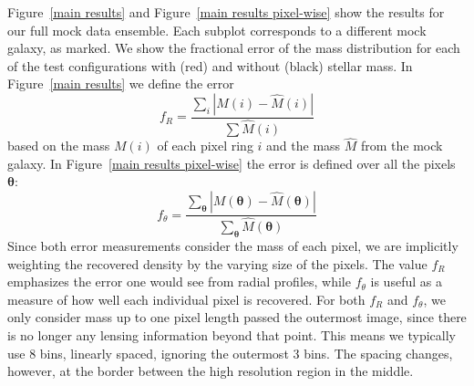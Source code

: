\documentclass[galley,usenatbib]{mn2e}
\renewcommand{\vec}[1]{\ensuremath{\boldsymbol{#1}}}
\newcommand{\figref}[1] {Figure~\ref{#1}}
\begin{document}
\figref{main results} and \figref{main results pixel-wise} show the results for
our full mock data ensemble. Each subplot corresponds to a different mock
galaxy, as marked. We show the fractional error of the mass distribution for
each of the test configurations with (red) and without (black) stellar mass. In
\figref{main results} we define the error
%
\begin{equation} \label{ferror R}
  f_R = \frac {\sum_i \left|M(i) - \widehat M(i)\right| } {\sum \widehat M(i)}
\end{equation}
%
based on the mass $M(i)$ of each pixel ring $i$ and the mass $\widehat M$ from the mock galaxy. 
In \figref{main results pixel-wise} the error is defined over all the pixels $\vec\theta$:
%
\begin{equation} \label{ferror theta}
f_\theta = \frac {\sum_{\vec\theta} \left|M(\vec\theta) - \widehat M(\vec\theta)\right| } {\sum_{\vec\theta} \widehat M(\vec\theta)}
\end{equation}
%
Since both error measurements consider the mass of each pixel, we are
implicitly weighting the recovered density by the varying size of the pixels.
The value $f_R$ emphasizes the error one would see from radial profiles, while
$f_\theta$ is useful as a measure of how well each individual pixel is recovered.
For both $f_R$ and $f_\theta$, we only consider mass up to one pixel length passed the
outermost image, since there is no longer any lensing information beyond that
point. This means we typically use 8 bins, linearly spaced, ignoring the
outermost 3 bins.  The spacing changes, however, at the border between the high
resolution region in the middle.
\end{document}

